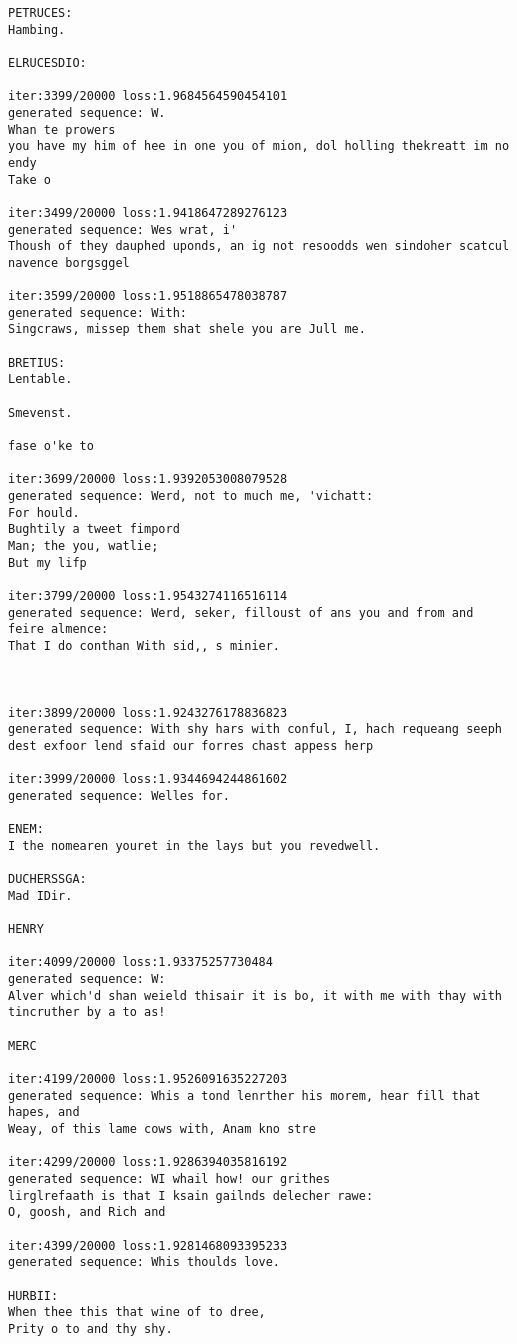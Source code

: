\documentclass[11pt]{article}
\begin{document}
\begin{Verbatim}[commandchars=\\\{\}]
PETRUCES:
Hambing.

ELRUCESDIO:

iter:3399/20000 loss:1.9684564590454101
generated sequence: W.
Whan te prowers
you have my him of hee in one you of mion, dol holling thekreatt im no endy
Take o

iter:3499/20000 loss:1.9418647289276123
generated sequence: Wes wrat, i'
Thoush of they dauphed uponds, an ig not resoodds wen sindoher scatcul navence borgsggel

iter:3599/20000 loss:1.9518865478038787
generated sequence: With:
Singcraws, missep them shat shele you are Jull me.

BRETIUS:
Lentable.

Smevenst.

fase o'ke to

iter:3699/20000 loss:1.9392053008079528
generated sequence: Werd, not to much me, 'vichatt:
For hould.
Bughtily a tweet fimpord
Man; the you, watlie;
But my lifp

iter:3799/20000 loss:1.9543274116516114
generated sequence: Werd, seker, filloust of ans you and from and feire almence:
That I do conthan With sid,, s minier.



iter:3899/20000 loss:1.9243276178836823
generated sequence: With shy hars with conful, I, hach requeang seeph
dest exfoor lend sfaid our forres chast appess herp

iter:3999/20000 loss:1.9344694244861602
generated sequence: Welles for.

ENEM:
I the nomearen youret in the lays but you revedwell.

DUCHERSSGA:
Mad IDir.

HENRY

iter:4099/20000 loss:1.93375257730484
generated sequence: W:
Alver which'd shan weield thisair it is bo, it with me with thay with tincruther by a to as!

MERC

iter:4199/20000 loss:1.9526091635227203
generated sequence: Whis a tond lenrther his morem, hear fill that hapes, and
Weay, of this lame cows with, Anam kno stre

iter:4299/20000 loss:1.9286394035816192
generated sequence: WI whail how! our grithes
lirglrefaath is that I ksain gailnds delecher rawe:
O, goosh, and Rich and 

iter:4399/20000 loss:1.9281468093395233
generated sequence: Whis thoulds love.

HURBII:
When thee this that wine of to dree,
Prity o to and thy shy.


\end{Verbatim}
\end{document}
